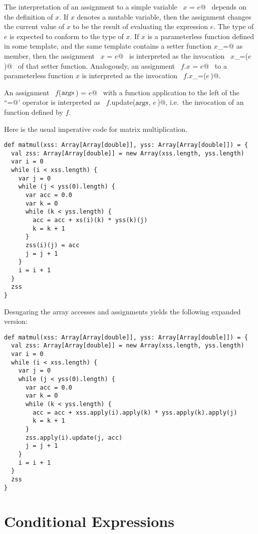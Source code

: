 The interpretation of an assignment to a simple variable ~\lstinline@$x$ = $e$@~
depends on the definition of $x$. If $x$ denotes a mutable
variable, then the assignment changes the current value of $x$ to be
the result of evaluating the expression $e$. The type of $e$ is
expected to conform to the type of $x$. If $x$ is a parameterless
function defined in some template, and the same template contains a
setter function \lstinline@$x$_=@ as member, then the assignment
~\lstinline@$x$ = $e$@~ is interpreted as the invocation
~\lstinline@$x$_=($e\,$)@~ of that setter function.  Analogously, an
assignment ~\lstinline@$f.x$ = $e$@~ to a parameterless function $x$
is interpreted as the invocation ~\lstinline@$f.x$_=($e\,$)@.

An assignment ~\lstinline@$f$($\mbox{\sl args}\,$) = $e$@~ with a function application to the
left of the ``\lstinline@=@' operator is interpreted as 
~\lstinline@$f.$update($\mbox{\sl args}$, $e\,$)@, i.e.\
the invocation of an  function defined by $f$.

\example \label{ex:imp-mat-mul}
Here is the usual imperative code for matrix multiplication.

\begin{lstlisting}
def matmul(xss: Array[Array[double]], yss: Array[Array[double]]) = {
  val zss: Array[Array[double]] = new Array(xss.length, yss.length) 
  var i = 0 
  while (i < xss.length) {
    var j = 0 
    while (j < yss(0).length) {
      var acc = 0.0 
      var k = 0 
      while (k < yss.length) {
        acc = acc + xs(i)(k) * yss(k)(j) 
        k = k + 1
      }
      zss(i)(j) = acc 
      j = j + 1
    }
    i = i + 1
  }
  zss
}
\end{lstlisting}
Desugaring the array accesses and assignments yields the following
expanded version:
\begin{lstlisting}
def matmul(xss: Array[Array[double]], yss: Array[Array[double]]) = {
  val zss: Array[Array[double]] = new Array(xss.length, yss.length) 
  var i = 0 
  while (i < xss.length) {
    var j = 0 
    while (j < yss(0).length) {
      var acc = 0.0 
      var k = 0 
      while (k < yss.length) {
        acc = acc + xss.apply(i).apply(k) * yss.apply(k).apply(j) 
        k = k + 1
      }
      zss.apply(i).update(j, acc) 
      j = j + 1
    }
    i = i + 1
  }
  zss
}
\end{lstlisting}

\section{Conditional Expressions}\label{sec:cond}

